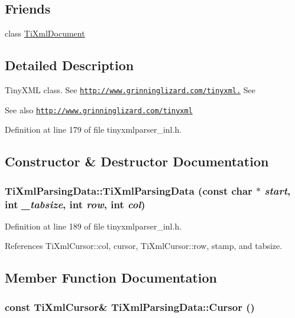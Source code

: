 \subsection*{Friends}
\begin{DoxyCompactItemize}
\item 
class \hyperlink{class_ti_xml_parsing_data_a173617f6dfe902cf484ce5552b950475}{TiXmlDocument}
\end{DoxyCompactItemize}


\subsection{Detailed Description}
TinyXML class. See \href{http://www.grinninglizard.com/tinyxml.}{\tt http://www.grinninglizard.com/tinyxml.} See \begin{DoxySeeAlso}{See also}
\href{http://www.grinninglizard.com/tinyxml}{\tt http://www.grinninglizard.com/tinyxml} 
\end{DoxySeeAlso}


Definition at line 179 of file tinyxmlparser\_\-inl.h.

\subsection{Constructor \& Destructor Documentation}
\hypertarget{class_ti_xml_parsing_data_aa5beaf71579a91d6942277f417899ab9}{
\subsubsection[{TiXmlParsingData}]{\setlength{\rightskip}{0pt plus 5cm}TiXmlParsingData::TiXmlParsingData (const char $\ast$ {\em start}, \/  int {\em \_\-tabsize}, \/  int {\em row}, \/  int {\em col})}}
\label{class_ti_xml_parsing_data_aa5beaf71579a91d6942277f417899ab9}


Definition at line 189 of file tinyxmlparser\_\-inl.h.

References TiXmlCursor::col, cursor, TiXmlCursor::row, stamp, and tabsize.

\subsection{Member Function Documentation}
\hypertarget{class_ti_xml_parsing_data_a56908a17d7d7a6b2e511e62cf1d40d05}{
\subsubsection[{Cursor}]{\setlength{\rightskip}{0pt plus 5cm}const {\bf TiXmlCursor}\& TiXmlParsingData::Cursor ()}}
\label{class_ti_xml_parsing_data_a56908a17d7d7a6b2e511e62cf1d40d05}


